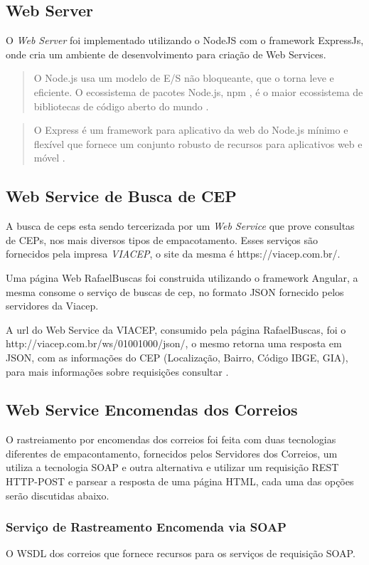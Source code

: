 \documentclass[12pt]{article}
\begin{document}
\subsection{Web Server}
	O \textit{Web Server} foi implementado utilizando o NodeJS com o framework ExpressJs, onde cria um ambiente de desenvolvimento para criação de Web Services.
	\begin{quote}
	O Node.js usa um modelo de E/S não bloqueante, que o torna leve e eficiente. O ecossistema de pacotes Node.js, npm , é o maior ecossistema de bibliotecas de código aberto do mundo \cite{nodejs}.
	\end{quote}
	\begin{quote}
	O Express é um framework para aplicativo da web do Node.js mínimo e flexível que fornece um conjunto robusto de recursos para aplicativos web e móvel \cite{expressjs}.
	\end{quote}

\subsection{Web Service de Busca de CEP}
	A busca de ceps esta sendo tercerizada por um \textit{Web Service} que prove consultas de CEPs, nos mais diversos tipos de empacotamento. Esses serviços são fornecidos pela impresa	\textit{VIACEP}, o site da mesma é https://viacep.com.br/.

	Uma página Web RafaelBuscas foi construida utilizando o framework Angular, a mesma consome o serviço de buscas de cep, no formato JSON fornecido pelos servidores da Viacep.
	
	A url do Web Service da VIACEP, consumido pela página RafaelBuscas, foi o http://viacep.com.br/ws/01001000/json/, o mesmo retorna uma resposta em JSON, com as informações do CEP (Localização, Bairro, Código IBGE, GIA), para mais informações sobre requisições consultar \cite{viacep}. 
	
\subsection{Web Service Encomendas dos Correios}
	O rastreiamento por encomendas dos correios foi feita com duas tecnologias diferentes de empacontamento, fornecidos pelos Servidores dos Correios, um utiliza a tecnologia SOAP e outra alternativa e utilizar um requisição REST HTTP-POST e parsear a resposta de uma página HTML, cada uma das opções serão discutidas abaixo.
\subsubsection{Serviço de Rastreamento Encomenda via SOAP}
O WSDL dos correios que fornece recursos para os serviços de requisição SOAP. 
\end{document}
